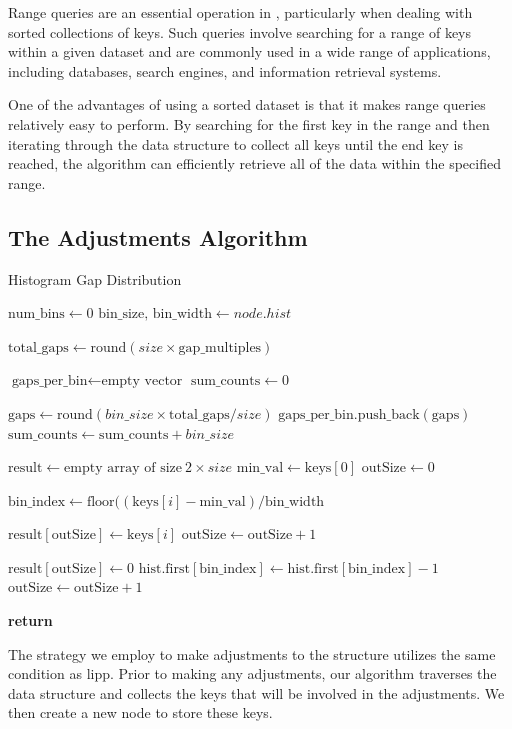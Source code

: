 Range queries are an essential operation in \learnindex, particularly when dealing with sorted collections of keys. Such queries involve searching for a range of keys within a given dataset and are commonly used in a wide range of applications, including databases, search engines, and information retrieval systems.

One of the advantages of using a sorted dataset is that it makes range queries relatively easy to perform. By searching for the first key in the range and then iterating through the data structure to collect all keys until the end key is reached, the algorithm can efficiently retrieve all of the data within the specified range.


\subsection{The Adjustments Algorithm}

\begin{algorithm}
\caption{Histogram Gap Distribution}
\begin{algorithmic}[1]
 \State $\text{num\_bins} \gets 0$
  \State $\text{bin\_size, bin\_width} \gets node.hist$
  
  \State $\text{total\_gaps} \gets \text{round}(size \times \text{gap\_multiples})$
  
  \State $\text{gaps\_per\_bin} \gets \text{empty vector}$
  \State $\text{sum\_counts} \gets 0$
  
    \State $\text{gaps} \gets \text{round}(bin\_size \times \text{total\_gaps} / size)$
    \State $\text{gaps\_per\_bin}.\text{push\_back}(\text{gaps})$
    \State $\text{sum\_counts} \gets \text{sum\_counts} + bin\_size$
  \EndFor
  
  \State $\text{result} \gets \text{empty array of size} \ 2 \times size$
  \State $\text{min\_val} \gets \text{keys}[0]$
  \State $\text{outSize} \gets 0$
  
    \State $\text{bin\_index} \gets \text{floor}((\text{keys}[i] - \text{min\_val}) / \text{bin\_width}$
    
    \State $\text{result}[\text{outSize}] \gets \text{keys}[i]$
    \State $\text{outSize} \gets \text{outSize} + 1$
    
      \State $\text{result}[\text{outSize}] \gets 0$
      \State $\text{hist.first}[\text{bin\_index}] \gets \text{hist.first}[\text{bin\_index}] - 1$
      \State $\text{outSize} \gets \text{outSize} + 1$
    \EndIf
  \EndFor
  
  \State \textbf{return} 
\EndProcedure
\end{algorithmic}
\end{algorithm}
The strategy we employ to make adjustments to the \learnindex structure utilizes the same condition as \acrshort{lipp}. Prior to making any adjustments, our algorithm traverses the data structure and collects the keys that will be involved in the adjustments. We then create a new node to store these keys. 

